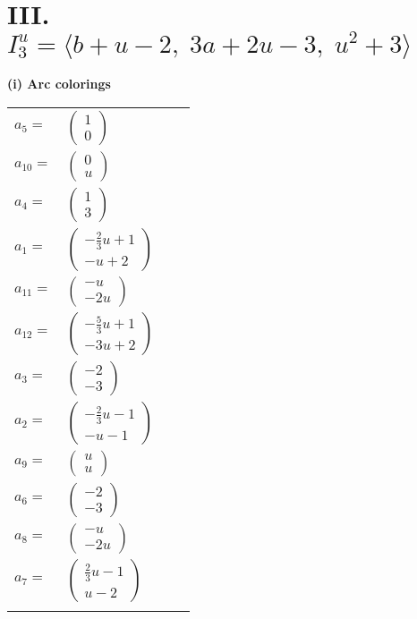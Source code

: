 \documentclass[1p]{elsarticle_modified}
\theoremstyle{definition}
\begin{document}
\centering \section*{III. $I^u_{3}= \langle b+u-2,\;3 a+2 u-3,\;u^2+3 \rangle$}
\flushleft \textbf{(i) Arc colorings}\\
\begin{tabular}{m{7pt} m{180pt} m{7pt} m{180pt} }
\flushright $a_{5}=$&$\begin{pmatrix}1\\0\end{pmatrix}$ \\
\flushright $a_{10}=$&$\begin{pmatrix}0\\u\end{pmatrix}$ \\
\flushright $a_{4}=$&$\begin{pmatrix}1\\3\end{pmatrix}$ \\
\flushright $a_{1}=$&$\begin{pmatrix}-\frac{2}{3} u+1\\- u+2\end{pmatrix}$ \\
\flushright $a_{11}=$&$\begin{pmatrix}- u\\-2 u\end{pmatrix}$ \\
\flushright $a_{12}=$&$\begin{pmatrix}-\frac{5}{3} u+1\\-3 u+2\end{pmatrix}$ \\
\flushright $a_{3}=$&$\begin{pmatrix}-2\\-3\end{pmatrix}$ \\
\flushright $a_{2}=$&$\begin{pmatrix}-\frac{2}{3} u-1\\- u-1\end{pmatrix}$ \\
\flushright $a_{9}=$&$\begin{pmatrix}u\\u\end{pmatrix}$ \\
\flushright $a_{6}=$&$\begin{pmatrix}-2\\-3\end{pmatrix}$ \\
\flushright $a_{8}=$&$\begin{pmatrix}- u\\-2 u\end{pmatrix}$ \\
\flushright $a_{7}=$&$\begin{pmatrix}\frac{2}{3} u-1\\u-2\end{pmatrix}$\\&\end{tabular}
\end{document}
